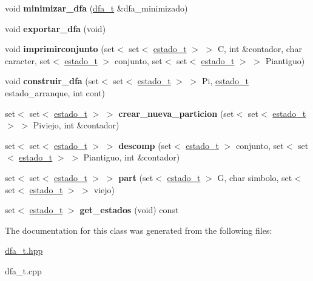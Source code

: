 \begin{DoxyCompactItemize}
\item 
\hypertarget{classdfa__t_abbbd26b5bdfdd59754dd43a0c45cceef}{void {\bfseries minimizar\-\_\-dfa} (\hyperlink{classdfa__t}{dfa\-\_\-t} \&dfa\-\_\-minimizado)}\label{classdfa__t_abbbd26b5bdfdd59754dd43a0c45cceef}

\item 
\hypertarget{classdfa__t_a3cadbfce756a7b08580e27b2a255d36f}{void {\bfseries exportar\-\_\-dfa} (void)}\label{classdfa__t_a3cadbfce756a7b08580e27b2a255d36f}

\item 
\hypertarget{classdfa__t_acb326e2aa39bdcaaf777f27f7892d728}{void {\bfseries imprimirconjunto} (set$<$ set$<$ \hyperlink{classestado__t}{estado\-\_\-t} $>$ $>$ C, int \&contador, char caracter, set$<$ \hyperlink{classestado__t}{estado\-\_\-t} $>$ conjunto, set$<$ set$<$ \hyperlink{classestado__t}{estado\-\_\-t} $>$ $>$ Piantiguo)}\label{classdfa__t_acb326e2aa39bdcaaf777f27f7892d728}

\item 
\hypertarget{classdfa__t_ade109fa3f2db54e7fe49172bd890540e}{void {\bfseries construir\-\_\-dfa} (set$<$ set$<$ \hyperlink{classestado__t}{estado\-\_\-t} $>$ $>$ Pi, \hyperlink{classestado__t}{estado\-\_\-t} estado\-\_\-arranque, int cont)}\label{classdfa__t_ade109fa3f2db54e7fe49172bd890540e}

\item 
\hypertarget{classdfa__t_a3a67953e49f03d2312b41109c761f108}{set$<$ set$<$ \hyperlink{classestado__t}{estado\-\_\-t} $>$ $>$ {\bfseries crear\-\_\-nueva\-\_\-particion} (set$<$ set$<$ \hyperlink{classestado__t}{estado\-\_\-t} $>$ $>$ Piviejo, int \&contador)}\label{classdfa__t_a3a67953e49f03d2312b41109c761f108}

\item 
\hypertarget{classdfa__t_a74f9e027e7cab94e023c37eda0576ce2}{set$<$ set$<$ \hyperlink{classestado__t}{estado\-\_\-t} $>$ $>$ {\bfseries descomp} (set$<$ \hyperlink{classestado__t}{estado\-\_\-t} $>$ conjunto, set$<$ set$<$ \hyperlink{classestado__t}{estado\-\_\-t} $>$ $>$ Piantiguo, int \&contador)}\label{classdfa__t_a74f9e027e7cab94e023c37eda0576ce2}

\item 
\hypertarget{classdfa__t_a829a49840af3df7c76c320568dfdafe6}{set$<$ set$<$ \hyperlink{classestado__t}{estado\-\_\-t} $>$ $>$ {\bfseries part} (set$<$ \hyperlink{classestado__t}{estado\-\_\-t} $>$ G, char simbolo, set$<$ set$<$ \hyperlink{classestado__t}{estado\-\_\-t} $>$ $>$ viejo)}\label{classdfa__t_a829a49840af3df7c76c320568dfdafe6}

\item 
\hypertarget{classdfa__t_a1b3354f1488ec7ff01de2fd89553f19d}{set$<$ \hyperlink{classestado__t}{estado\-\_\-t} $>$ {\bfseries get\-\_\-estados} (void) const }\label{classdfa__t_a1b3354f1488ec7ff01de2fd89553f19d}

\end{DoxyCompactItemize}


The documentation for this class was generated from the following files\-:\begin{DoxyCompactItemize}
\item 
\hyperlink{dfa__t_8hpp}{dfa\-\_\-t.\-hpp}\item 
dfa\-\_\-t.\-cpp\end{DoxyCompactItemize}
